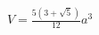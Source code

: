 \documentclass[preview]{standalone}
\begin{document}
\begin{align*}
V = \frac{5(3+\sqrt{5})}{12}a^3
\end{align*}
\end{document}
